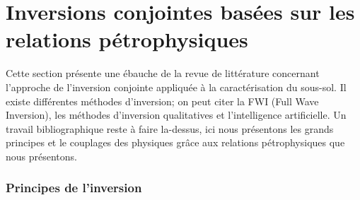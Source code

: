 


\section{Inversions conjointes basées sur les relations pétrophysiques}

Cette section présente une ébauche de la revue de littérature concernant l'approche de l'inversion conjointe appliquée à la caractérisation du sous-sol. Il existe différentes méthodes d'inversion; on peut citer la FWI (Full Wave Inversion), les méthodes d'inversion qualitatives et l'intelligence artificielle. Un travail bibliographique reste à faire la-dessus, ici nous présentons les grands principes et le couplages des physiques grâce aux relations pétrophysiques que nous présentons.

\subsubsection*{Principes de l'inversion}

